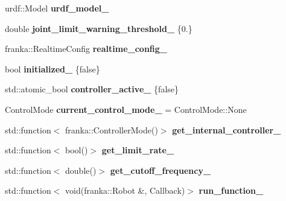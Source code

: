 \begin{DoxyCompactItemize}
urdf\+::\+Model {\bfseries urdf\+\_\+model\+\_\+}
\item 
\mbox{\label{classfranka__hw_1_1_franka_h_w_a3881414ad06c12e6f747c7054fbc1092}} 
double {\bfseries joint\+\_\+limit\+\_\+warning\+\_\+threshold\+\_\+} \{0.\}
\item 
\mbox{\label{classfranka__hw_1_1_franka_h_w_a193b40f1d42ff3f1b805bbef4a9c2749}} 
franka\+::\+Realtime\+Config {\bfseries realtime\+\_\+config\+\_\+}
\item 
\mbox{\label{classfranka__hw_1_1_franka_h_w_a08acb4bfdbe78711dc466e74ee56a61d}} 
bool {\bfseries initialized\+\_\+} \{false\}
\item 
\mbox{\label{classfranka__hw_1_1_franka_h_w_aa207ee4ba133fdb1b3887c9639b47b40}} 
std\+::atomic\+\_\+bool {\bfseries controller\+\_\+active\+\_\+} \{false\}
\item 
\mbox{\label{classfranka__hw_1_1_franka_h_w_a4eb4ed0043449742cadefa5809d9c6f0}} 
Control\+Mode {\bfseries current\+\_\+control\+\_\+mode\+\_\+} = Control\+Mode\+::\+None
\item 
\mbox{\label{classfranka__hw_1_1_franka_h_w_a0e2aab0e386f9ed57345cd56f02643ac}} 
std\+::function$<$ franka\+::\+Controller\+Mode()$>$ {\bfseries get\+\_\+internal\+\_\+controller\+\_\+}
\item 
\mbox{\label{classfranka__hw_1_1_franka_h_w_a0d26d3a30e63e83e19cad138a9811fc7}} 
std\+::function$<$ bool()$>$ {\bfseries get\+\_\+limit\+\_\+rate\+\_\+}
\item 
\mbox{\label{classfranka__hw_1_1_franka_h_w_ada3ea355cd85b06247ee9def60485240}} 
std\+::function$<$ double()$>$ {\bfseries get\+\_\+cutoff\+\_\+frequency\+\_\+}
\item 
\mbox{\label{classfranka__hw_1_1_franka_h_w_ab53d17aecdb62936defdcde99e9b88b8}} 
std\+::function$<$ void(franka\+::\+Robot \&, Callback)$>$ {\bfseries run\+\_\+function\+\_\+}
\end{DoxyCompactItemize}


